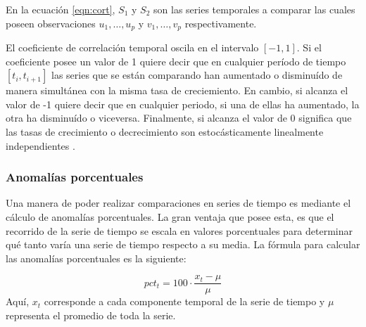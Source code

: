      En la ecuación \ref{eqn:cort}, $S_1$ y $S_2$ son las series temporales a comparar las cuales poseen observaciones $ u_1,\dots,u_p $ y $ v_1,\dots,v_p$ respectivamente.

     El coeficiente de correlación temporal oscila en el intervalo $[-1,1]$. Si el coeficiente posee un valor de 1 quiere decir que en cualquier período de tiempo $[t_i,t_{i+1}]$ las series
     que se están comparando han aumentado o disminuído de manera simultánea con la misma tasa de creciemiento. En cambio, si alcanza el valor de -1 quiere decir que en cualquier periodo, si una de ellas ha
     aumentado, la otra ha disminuído o viceversa. Finalmente, si alcanza el valor de 0 significa que las tasas de crecimiento o decrecimiento son estocásticamente linealmente independientes \cite{27}.

     \subsubsection{Anomalías porcentuales}
     Una manera de poder realizar comparaciones en series de tiempo es mediante el cálculo de anomalías porcentuales. La gran ventaja que posee esta, es que el recorrido de la serie de tiempo
     se escala en valores porcentuales para determinar qué tanto varía una serie de tiempo respecto a su media. La fórmula para calcular las anomalías porcentuales es la siguiente:

    \begin{equation}\label{pct_anomalies}
        pct_t = 100 \cdot\frac{x_t-\mu}{\mu}
    \end{equation}
    Aquí, $x_t$ corresponde a cada componente temporal de la serie de tiempo y $\mu$ representa el promedio de toda la serie. 
